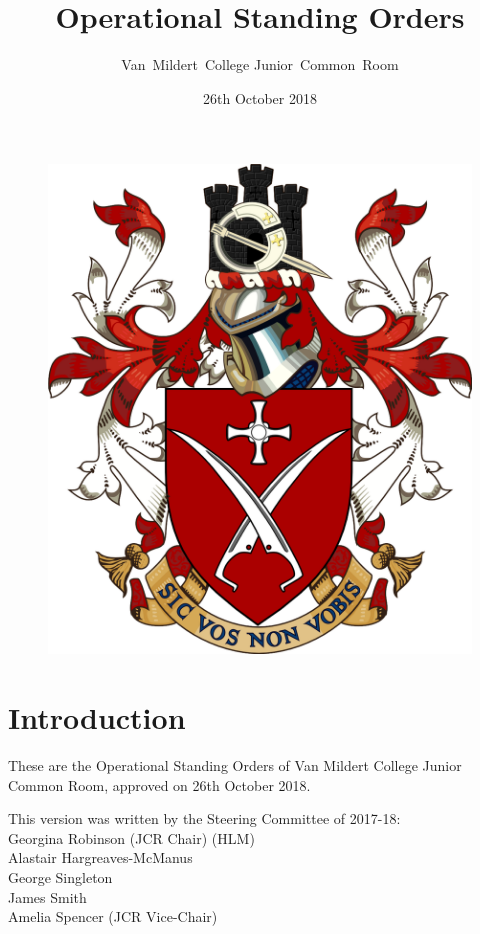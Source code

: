 \documentclass[12pt]{article}  %
\title{Operational Standing Orders}
\author{Van~Mildert~College Junior~Common~Room}
\date{26th October 2018}
\begin{document}
\begin{titlepage}  %
\maketitle
\begin{figure}[h]
\includegraphics[scale=0.25]{arms}  %
\centering
\end{figure}
\thispagestyle{empty}
\end{titlepage}

\setcounter{page}{2}  %
\section*{Introduction}
These are the Operational Standing Orders of Van Mildert College Junior Common Room, approved on 26th October 2018.

This version was written by the Steering Committee of 2017-18:\\
\hspace*{2cm}Georgina Robinson (JCR Chair) (HLM)\\
\hspace*{2cm}Alastair Hargreaves-McManus\\
\hspace*{2cm}George Singleton\\
\hspace*{2cm}James Smith\\
\hspace*{2cm}Amelia Spencer (JCR Vice-Chair)
\end{document}
